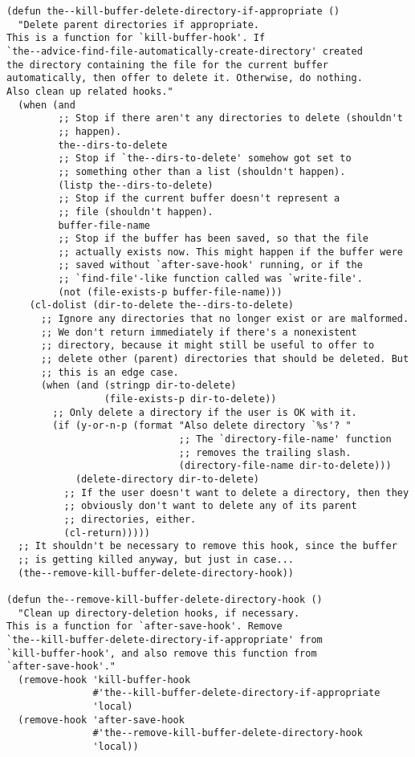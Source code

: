 \documentclass[11pt]{article}
\begin{document}
\begin{enumerate}
\begin{verbatim}
(defun the--kill-buffer-delete-directory-if-appropriate ()
  "Delete parent directories if appropriate.
This is a function for `kill-buffer-hook'. If
`the--advice-find-file-automatically-create-directory' created
the directory containing the file for the current buffer
automatically, then offer to delete it. Otherwise, do nothing.
Also clean up related hooks."
  (when (and
         ;; Stop if there aren't any directories to delete (shouldn't
         ;; happen).
         the--dirs-to-delete
         ;; Stop if `the--dirs-to-delete' somehow got set to
         ;; something other than a list (shouldn't happen).
         (listp the--dirs-to-delete)
         ;; Stop if the current buffer doesn't represent a
         ;; file (shouldn't happen).
         buffer-file-name
         ;; Stop if the buffer has been saved, so that the file
         ;; actually exists now. This might happen if the buffer were
         ;; saved without `after-save-hook' running, or if the
         ;; `find-file'-like function called was `write-file'.
         (not (file-exists-p buffer-file-name)))
    (cl-dolist (dir-to-delete the--dirs-to-delete)
      ;; Ignore any directories that no longer exist or are malformed.
      ;; We don't return immediately if there's a nonexistent
      ;; directory, because it might still be useful to offer to
      ;; delete other (parent) directories that should be deleted. But
      ;; this is an edge case.
      (when (and (stringp dir-to-delete)
                 (file-exists-p dir-to-delete))
        ;; Only delete a directory if the user is OK with it.
        (if (y-or-n-p (format "Also delete directory `%s'? "
                              ;; The `directory-file-name' function
                              ;; removes the trailing slash.
                              (directory-file-name dir-to-delete)))
            (delete-directory dir-to-delete)
          ;; If the user doesn't want to delete a directory, then they
          ;; obviously don't want to delete any of its parent
          ;; directories, either.
          (cl-return)))))
  ;; It shouldn't be necessary to remove this hook, since the buffer
  ;; is getting killed anyway, but just in case...
  (the--remove-kill-buffer-delete-directory-hook))

(defun the--remove-kill-buffer-delete-directory-hook ()
  "Clean up directory-deletion hooks, if necessary.
This is a function for `after-save-hook'. Remove
`the--kill-buffer-delete-directory-if-appropriate' from
`kill-buffer-hook', and also remove this function from
`after-save-hook'."
  (remove-hook 'kill-buffer-hook
               #'the--kill-buffer-delete-directory-if-appropriate
               'local)
  (remove-hook 'after-save-hook
               #'the--remove-kill-buffer-delete-directory-hook
               'local))
\end{verbatim}


\end{enumerate}
\end{document}
